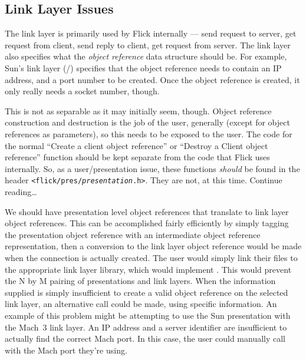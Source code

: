 

\subsection{Link Layer Issues}
\label{subsec:Runtime:Link Layer Issues}

The link layer is primarily used by Flick internally --- send request to
server, get request from client, send reply to client, get request from server.
The link layer also specifies what the \emph{object reference} data structure
should be.  For example, Sun's \RPC{} link layer (\TCP{}/\UDP{}) specifies that
the object reference needs to contain an IP address, and a port number to be
created.  Once the object reference is created, it only really needs a socket
number, though.

This is not as separable as it may initially seem, though.  Object reference
construction and destruction is the job of the user, generally (except for
object references as parameters), so this needs to be exposed to the user.  The
code for the normal ``Create a client object reference'' or ``Destroy a Client
object reference'' function should be kept separate from the code that Flick
uses internally.  So, as a user/presentation issue, these functions
\emph{should} be found in the header
\texttt{<flick/pres/\emph{presentation}.h>}.  They are not, at this time.
Continue reading\ldots{}

We should have presentation level object references that translate to link
layer object references.  This can be accomplished fairly efficiently by simply
tagging the presentation object reference with an intermediate object reference
representation, then a conversion to the link layer object reference would be
made when the connection is actually created.  The user would simply link their
files to the appropriate link layer library, which would implement
.  This would prevent the N by M pairing of
presentations and link layers.  When the information supplied is simply
insufficient to create a valid object reference on the selected link layer, an
alternative call could be made, using specific information.  An example of this
problem might be attempting to use the Sun \RPC{} presentation with the Mach~3
link layer.  An IP address and a server identifier are insufficient to actually
find the correct Mach port.  In this case, the user could manually call
 with the Mach port they're using.

